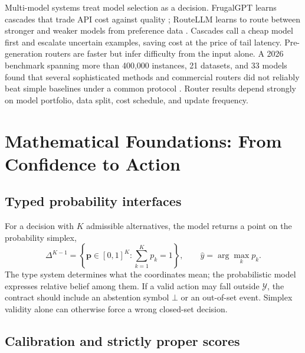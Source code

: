 \documentclass[11pt]{article}
\begin{document}
Multi-model systems treat model selection as a decision. FrugalGPT learns cascades that trade API cost against quality \cite{chen2023frugalgpt}; RouteLLM learns to route between stronger and weaker models from preference data \cite{ong2024routellm}. Cascades call a cheap model first and escalate uncertain examples, saving cost at the price of tail latency. Pre-generation routers are faster but infer difficulty from the input alone. A 2026 benchmark spanning more than 400,000 instances, 21 datasets, and 33 models found that several sophisticated methods and commercial routers did not reliably beat simple baselines under a common protocol \cite{li2026routerbench}. Router results depend strongly on model portfolio, data split, cost schedule, and update frequency.

\section{Mathematical Foundations: From Confidence to Action}

\subsection{Typed probability interfaces}

For a decision with $K$ admissible alternatives, the model returns a point on the probability simplex,
\begin{equation}
\Delta^{K-1}=\left\{\mathbf p\in[0,1]^K:\sum_{k=1}^{K}p_k=1\right\},
\qquad \hat y=\arg\max_k p_k.
\end{equation}
The type system determines what the coordinates mean; the probabilistic model expresses relative belief among them. If a valid action may fall outside $\mathcal{Y}$, the contract should include an abstention symbol $\bot$ or an out-of-set event. Simplex validity alone can otherwise force a wrong closed-set decision.

\subsection{Calibration and strictly proper scores}
\end{document}
